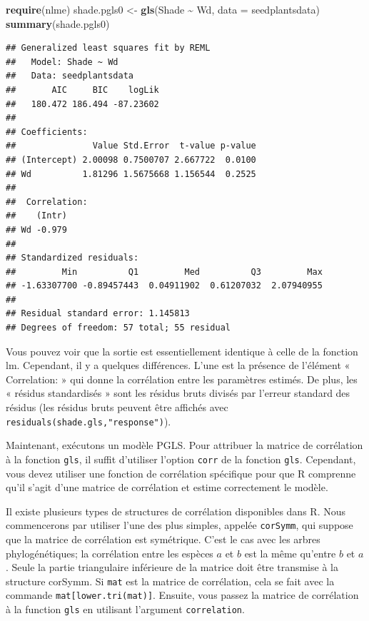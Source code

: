 \documentclass[
]{book}
\newenvironment{Shaded}{\begin{snugshade}}{\end{snugshade}}
\newcommand{\AttributeTok}[1]{\textcolor[rgb]{0.13,0.29,0.53}{#1}}
\newcommand{\FunctionTok}[1]{\textcolor[rgb]{0.13,0.29,0.53}{\textbf{#1}}}
\newcommand{\NormalTok}[1]{#1}
\newcommand{\OtherTok}[1]{\textcolor[rgb]{0.56,0.35,0.01}{#1}}
\newcommand{\SpecialCharTok}[1]{\textcolor[rgb]{0.81,0.36,0.00}{\textbf{#1}}}
\begin{document}
\begin{Shaded}
\begin{Highlighting}[]
\FunctionTok{require}\NormalTok{(nlme)}
\NormalTok{shade.pgls0 }\OtherTok{\textless{}{-}} \FunctionTok{gls}\NormalTok{(Shade }\SpecialCharTok{\textasciitilde{}}\NormalTok{ Wd, }\AttributeTok{data =}\NormalTok{ seedplantsdata)}
\FunctionTok{summary}\NormalTok{(shade.pgls0)}
\end{Highlighting}
\end{Shaded}

\begin{verbatim}
## Generalized least squares fit by REML
##   Model: Shade ~ Wd 
##   Data: seedplantsdata 
##       AIC     BIC    logLik
##   180.472 186.494 -87.23602
## 
## Coefficients:
##               Value Std.Error  t-value p-value
## (Intercept) 2.00098 0.7500707 2.667722  0.0100
## Wd          1.81296 1.5675668 1.156544  0.2525
## 
##  Correlation: 
##    (Intr)
## Wd -0.979
## 
## Standardized residuals:
##         Min          Q1         Med          Q3         Max 
## -1.63307700 -0.89457443  0.04911902  0.61207032  2.07940955 
## 
## Residual standard error: 1.145813 
## Degrees of freedom: 57 total; 55 residual
\end{verbatim}

Vous pouvez voir que la sortie est essentiellement identique à celle de la fonction lm. Cependant, il y a quelques différences. L'une est la présence de l'élément « Correlation: » qui donne la corrélation entre les paramètres estimés. De plus, les « résidus standardisés » sont les résidus bruts divisés par l'erreur standard des résidus (les résidus bruts peuvent être affichés avec \texttt{residuals(shade.gls,"response")}).

Maintenant, exécutons un modèle PGLS. Pour attribuer la matrice de corrélation à la fonction \texttt{gls}, il suffit d'utiliser l'option \texttt{corr} de la fonction \texttt{gls}. Cependant, vous devez utiliser une fonction de corrélation spécifique pour que R comprenne qu'il s'agit d'une matrice de corrélation et estime correctement le modèle.

Il existe plusieurs types de structures de corrélation disponibles dans R. Nous commencerons par utiliser l'une des plus simples, appelée \texttt{corSymm}, qui suppose que la matrice de corrélation est symétrique. C'est le cas avec les arbres phylogénétiques; la corrélation entre les espèces \(a\) et \(b\) est la même qu'entre \(b\) et \(a\). Seule la partie triangulaire inférieure de la matrice doit être transmise à la structure corSymm. Si \texttt{mat} est la matrice de corrélation, cela se fait avec la commande \texttt{mat{[}lower.tri(mat){]}}. Ensuite, vous passez la matrice de corrélation à la function \texttt{gls} en utilisant l'argument \texttt{correlation}.
\end{document}
